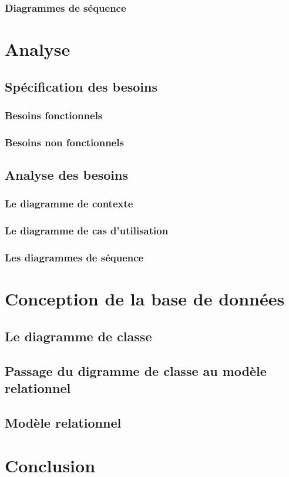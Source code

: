         \subsubsection{Diagrammes de séquence}

\section{Analyse}
    \subsection{Spécification des besoins}
        \subsubsection{Besoins fonctionnels}
        \subsubsection{Besoins non fonctionnels}

    \subsection{Analyse des besoins}
        \subsubsection{Le diagramme de contexte}
        \subsubsection{Le diagramme de cas d'utilisation}
        \subsubsection{Les diagrammes de séquence}
        
        
\section{Conception de la base de données}
    \subsection{Le diagramme de classe}
    \subsection{Passage du digramme de classe au modèle relationnel}
    \subsection{Modèle relationnel}

\section{Conclusion}